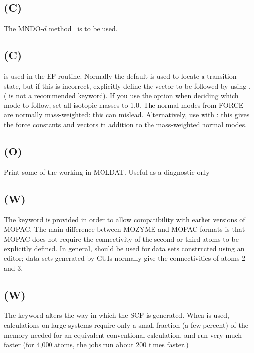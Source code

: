 \subsection*{ (C)}
The MNDO-$d$ method~\cite{mndod_0,mndod} is to be used.

\subsection*{ (C)}
         is used in the EF routine.  Normally the default  is used
   to locate a transition state, but if this is incorrect, explicitly define
   the vector to be followed by using .  ( is  not  a  recommended
   keyword).   If  you  use  the    option  when deciding which mode to
   follow, set all isotopic masses to 1.0.  The normal modes from FORCE  are
   normally  mass-weighted: this can mislead.  Alternatively, use  with
   :  this gives the force constants and vectors  in  addition  to  the
   mass-weighted  normal  modes.

\subsection*{ (O)}
Print some of the working in MOLDAT. Useful as a diagnostic only

\subsection*{ (W)}
The keyword  is provided in order to allow compatibility with
earlier versions of MOPAC.  The main difference between MOZYME and MOPAC formats
is that MOPAC
does not require the connectivity of the second or third atoms to be explicitly
defined.  In general,  should be used for data sets constructed using
an editor; data sets generated by GUIs normally give the connectivities of
atoms 2 and 3.


\subsection*{ (W)}
The keyword  alters the way in which the SCF is generated.
When  is used, calculations on large systems require only a
small fraction (a few percent) of the memory needed for an equivalent
conventional calculation, and run very much faster (for 4,000 atoms,
the jobs run about 200 times faster.)
